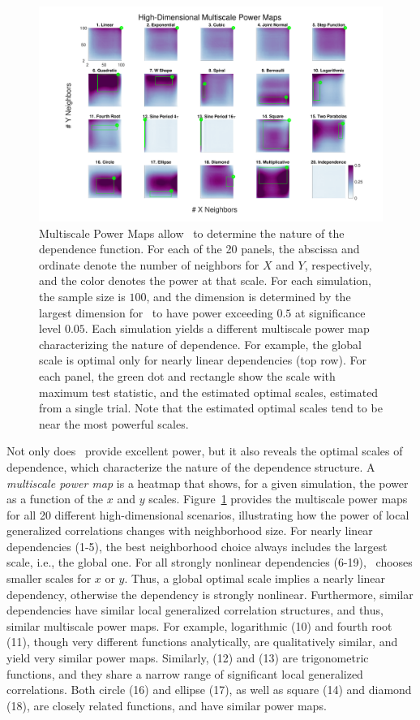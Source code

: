 \documentclass[11pt]{article}
\begin{document}
\begin{figure}[!ht]
\includegraphics[width=1.0\textwidth,trim={3cm 0.5cm 2.3cm 0.5cm},clip]{Figures/FigHDHeat}
\caption{Multiscale Power Maps allow \Mgc~to determine the nature of the dependence function.
For each of the 20 panels, the abscissa and ordinate denote the number of neighbors for $X$ and  $Y$, respectively, and the color denotes the power at that scale. For each simulation, the sample size is $100$,  and the dimension is determined by the largest dimension for \Mgc~to have power exceeding $0.5$ at significance level $0.05$. Each simulation yields a different multiscale power map characterizing the nature of dependence. 
For example, the global scale is optimal only for nearly linear dependencies (top row). 
For each panel, the green dot and rectangle show the scale with maximum test statistic,  and the estimated optimal scales, estimated from a single trial. Note that the estimated optimal scales tend to be near the most powerful scales.
}
\label{f:powermaps}
\end{figure}


Not only does \Mgc~provide excellent power, but it also reveals the optimal scales of dependence, which characterize the nature of the dependence structure. 
A \emph{multiscale power map} is a heatmap that shows, for a given simulation, the power as a function of the $x$ and $y$ scales.  
Figure~\ref{f:powermaps} provides the multiscale power maps for all 20 different high-dimensional scenarios, illustrating how the power of local generalized correlations changes with  neighborhood size.
For nearly linear dependencies (1-5), the best neighborhood choice always includes the largest scale, i.e., the global one. For all strongly nonlinear dependencies (6-19),  \Mgc~chooses smaller scales for $x$ or $y$. Thus, a global optimal scale implies a nearly linear dependency, otherwise the dependency is strongly nonlinear.
Furthermore, similar dependencies have similar local generalized correlation structures, and thus, similar multiscale power maps. For example, logarithmic (10) and fourth root (11), though very different functions analytically, are qualitatively similar, and yield very similar power maps.
Similarly,  (12) and (13) are trigonometric functions, and they share a narrow range of significant local generalized correlations.
Both circle (16) and ellipse (17), as well as square (14) and diamond (18), are closely related functions, and have similar  power maps. 
\end{document}
